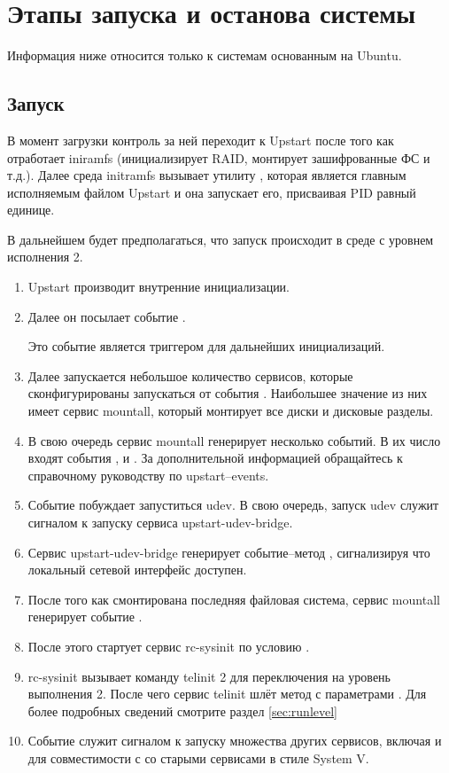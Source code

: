 \chapter{Этапы запуска и останова системы}
Информация ниже относится только к системам основанным на Ubuntu.
\section{Запуск}
В момент загрузки контроль за ней переходит к Upstart после того как отработает iniramfs (инициализирует 
RAID, монтирует зашифрованные ФС и т.д.). Далее среда initramfs вызывает утилиту , которая является главным исполняемым файлом Upstart и она запускает его, присваивая PID равный единице.

В дальнейшем будет предполагаться, что запуск происходит в среде с уровнем исполнения 2. \begin{enumerate}
\item Upstart производит внутренние инициализации.
\item Далее он посылает событие .

Это событие является триггером для дальнейших инициализаций.
\item Далее запускается небольшое количество сервисов, которые сконфигурированы запускаться от события . Наибольшее значение из них имеет сервис mountall, который монтирует все диски и дисковые разделы.
\item В свою очередь сервис mountall генерирует несколько событий. В их число входят события ,  и . За дополнительной информацией обращайтесь к справочному руководству по upstart--events.
\item Событие  побуждает запуститься udev. В свою очередь, запуск udev служит сигналом к запуску сервиса upstart-udev-bridge.
\item Сервис upstart-udev-bridge генерирует событие--метод , сигнализируя 
что локальный сетевой интерфейс доступен.
\item После того как смонтирована последняя файловая система, сервис mountall генерирует событие .
\item После этого стартует сервис rc-sysinit по условию .
\item rc-sysinit вызывает команду telinit 2 для переключения на уровень выполнения 2. После чего сервис telinit шлёт метод с параметрами . Для более подробных сведений смотрите раздел \ref{sec:runlevel}
\item Событие  служит сигналом к запуску множества других сервисов, включая и  для совместимости с со старыми сервисами в стиле System V.
\end{enumerate}
